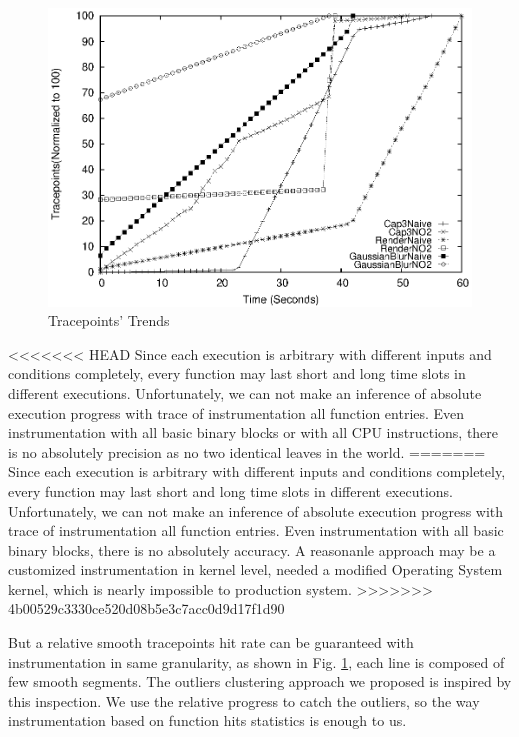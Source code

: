 \begin{figure}
\centering
\includegraphics[width=0.9\columnwidth]{figures/tracepoints_all_vs_sampling.eps}
\caption{Tracepoints' Trends}
\label{figure:tracepoints}
\end{figure}

<<<<<<< HEAD
Since each execution is arbitrary with different inputs and conditions completely, every function may last short and long time slots in different executions. Unfortunately, we can not make an inference of absolute execution progress with  trace of instrumentation all function entries. Even instrumentation with all basic binary blocks or with all CPU instructions, there is no absolutely precision as no two identical leaves in the world.
=======
Since each execution is arbitrary with different inputs and conditions completely, every function may last short and long time slots in different executions. Unfortunately, we can not make an inference of absolute execution progress with  trace of instrumentation all function entries. Even instrumentation with all basic binary blocks, there is no absolutely accuracy. A reasonanle approach may be a customized instrumentation in kernel level, needed a modified Operating System kernel, which is nearly impossible to production system.
>>>>>>> 4b00529c3330ce520d08b5e3c7acc0d9d17f1d90

But a relative smooth tracepoints hit rate can be guaranteed with instrumentation in same granularity, as shown in Fig.  \ref{figure:tracepoints}, each line is composed of few smooth segments. The outliers clustering approach we proposed is inspired by this inspection. We use the relative progress to catch the outliers, so the way instrumentation based on function hits statistics is enough to us.

